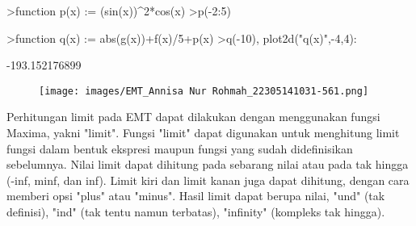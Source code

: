 \documentclass[a4paper,10pt]{article}
\begin{document}
\begin{eulernotebook}
\begin{eulerprompt}
>function p(x) := (sin(x))^2*cos(x)
>p(-2:5)
\end{eulerprompt}
\begin{euleroutput}
  [-0.344079,  0.382574,  0,  0.382574,  -0.344079,  -0.0197156,
  -0.374374,  0.260838]
\end{euleroutput}
\begin{eulerprompt}
>function q(x) := abs(g(x))+f(x)/5+p(x)
>q(-10), plot2d("q(x)",-4,4):
\end{eulerprompt}
\begin{euleroutput}
  -193.152176899
\end{euleroutput}
\begin{figure}[h]
    \centering
    \texttt{[image: images/EMT\_Annisa Nur Rohmah\_22305141031-561.png]}
\end{figure}
\begin{eulercomment}

\end{eulercomment}
\begin{eulercomment}
Perhitungan limit pada EMT dapat dilakukan dengan menggunakan fungsi
Maxima, yakni "limit". Fungsi "limit" dapat digunakan untuk menghitung
limit fungsi dalam bentuk ekspresi maupun fungsi yang sudah
didefinisikan sebelumnya. Nilai limit dapat dihitung pada sebarang
nilai atau pada tak hingga (-inf, minf, dan inf). Limit kiri dan limit
kanan juga dapat dihitung, dengan cara memberi opsi "plus" atau
"minus". Hasil limit dapat berupa nilai, "und" (tak definisi), "ind"
(tak tentu namun terbatas), "infinity" (kompleks tak hingga).


\end{eulercomment}
\end{eulernotebook}
\end{document}

